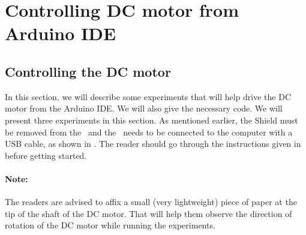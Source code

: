 \section{Controlling DC motor from Arduino IDE} 
\subsection{Controlling the DC motor}
\label{sec:dcm-ard}
In this section, we will describe some experiments that will help
drive the DC motor from the Arduino IDE.  We will also give the
necessary code.  We will present three experiments in this section. 
As mentioned earlier, the Shield must be removed from 
the \arduino\ and the \arduino\ needs to be connected to the computer 
with a USB cable, as shown in . The reader should go through the
instructions given in  before getting started. 

\paragraph{Note:} The readers are advised to affix a small 
(very lightweight) piece of paper at the tip of the shaft of the DC motor. 
That will help them observe the direction of rotation 
of the DC motor while running the experiments. 

